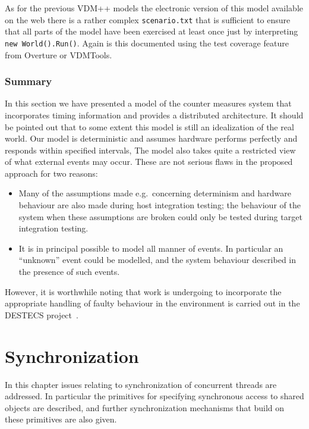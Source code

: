 \documentclass{overturerepchap}
\newcommand{\VDMTools}{VDMTools}
\begin{document}
As for the previous VDM++ models the electronic
version of this model available on the web there is a rather complex 
\texttt{scenario.txt} that is sufficient to ensure that all parts of the
model have been exercised at least once just by interpreting
\texttt{new World().Run()}. Again is this documented using the test
coverage feature from Overture or \VDMTools.

\subsection{Summary}

In this section we have presented a model of the counter measures
system that incorporates timing information and provides a distributed
architecture. It should be pointed out that to some extent this model
is still an idealization of the real world. Our model is deterministic and
assumes hardware performs perfectly and responds within specified
intervals, The model also takes quite a restricted view of what
external events may occur. These are not serious flaws in the proposed
approach for two reasons:

\begin{itemize}
\item Many of the assumptions made e.g.\ concerning determinism and
hardware behaviour are also made during host integration testing;
the behaviour of the system when these assumptions are broken could
only be tested during target integration testing.
\item It is in principal possible to model all manner of events. In
particular an ``unknown'' event could be modelled, and the system
behaviour described in the presence of such events.
\end{itemize}

However, it is worthwhile noting that work is undergoing to
incorporate the appropriate handling of faulty behaviour in the
environment is carried out in the DESTECS project~\cite{Broenink&10,Fitzgerald&10b}. 

\chapter{Synchronization}\label{chap:sync}

In this chapter issues relating to synchronization of concurrent
threads are addressed.  In particular the primitives for specifying
synchronous access to shared objects are described, and further
synchronization mechanisms that build on these primitives are also
given.
\end{document}
